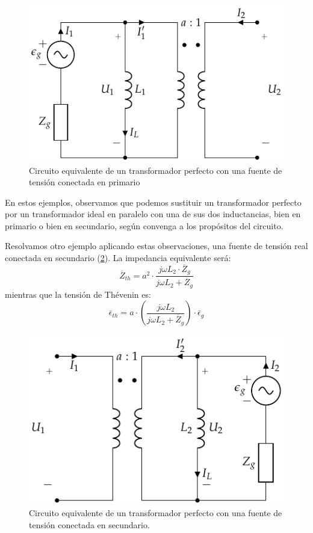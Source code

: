  \begin{figure}
    \centering
    \includegraphics[height=0.2\textheight]{../figs/TrafoPerfecto_Ideal_FuentePrim.pdf}
    \caption{Circuito equivalente de un transformador perfecto con una fuente de tensión conectada en primario}
    \label{fig:trafo-perfecto-ideal-V1}
  \end{figure}

  En estos ejemplos, observamos que podemos sustituir un transformador perfecto por un transformador ideal en paralelo con una de sus dos inductancias, bien en primario o bien en secundario, según convenga a los propósitos del circuito.

  Resolvamos otro ejemplo aplicando estas observaciones, una fuente de tensión real conectada en secundario (\ref{fig:trafo-perfecto-ideal-V2}). La impedancia equivalente será:
  \[
    \overline{Z}_{th} = a^2 \cdot \frac{j \omega L_2 \cdot
    \overline{Z}_g}{j\omega L_2 + \overline{Z}_g}
  \]
mientras que la tensión de Thévenin es:
  \[
    \overline{\epsilon}_{th} = a \cdot \left(\frac{j\omega
      L_2}{j\omega L_2 + \overline{Z}_g}\right) \cdot
    \overline{\epsilon}_g
  \]

  \begin{figure}
    \centering
    \includegraphics[height=0.2\textheight]{../figs/TrafoPerfecto_Ideal_FuenteSec.pdf}
    \caption{Circuito equivalente de un transformador perfecto con una fuente de tensión conectada en secundario.}
    \label{fig:trafo-perfecto-ideal-V2}
  \end{figure}

